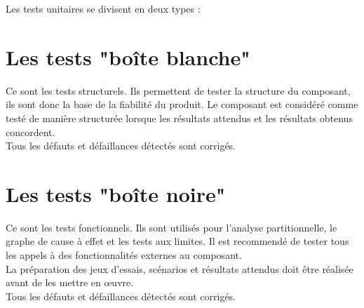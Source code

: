 Les tests unitaires se divisent en deux types :

\section{Les tests "boîte blanche"}
	Ce sont les tests structurels. Ils permettent de tester la structure du composant, ils sont donc la base de la fiabilité du produit. Le composant est considéré comme testé de manière structurée lorsque les résultats attendus et les résultats obtenus concordent. \\
	
	Tous les défauts et défaillances détectés sont corrigés.
	
\section{Les tests "boîte noire"}
	Ce sont les tests fonctionnels. Ils sont utilisés pour l’analyse partitionnelle, le graphe de cause à effet et les tests aux limites. Il est recommendé de tester tous les appels à des fonctionnalités externes au composant. \\
	
	La préparation des jeux d’essais, scénarios et résultats attendus doit être réalisée avant de les mettre en œuvre. \\
	
	Tous les défauts et défaillances détectés sont corrigés.
	